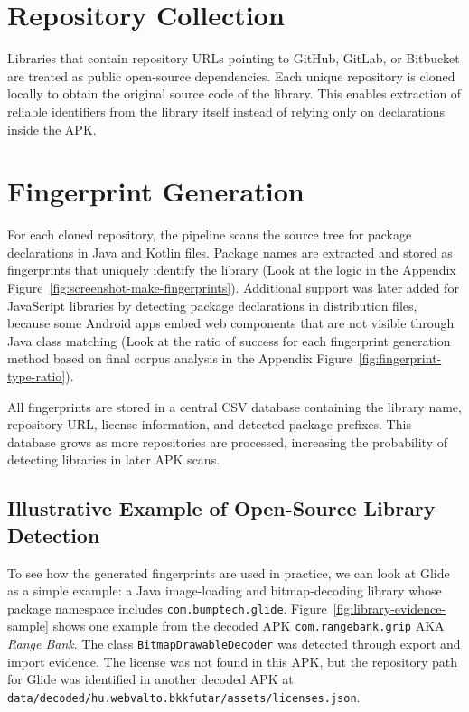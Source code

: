 \documentclass[12pt,a4paper]{report}
\begin{document}
\section{Repository Collection}
Libraries that contain repository URLs pointing to GitHub, GitLab, or Bitbucket are treated as public open‑source dependencies. Each unique repository is cloned locally to obtain the original source code of the library. This enables extraction of reliable identifiers from the library itself instead of relying only on declarations inside the APK. 

\section{Fingerprint Generation}
For each cloned repository, the pipeline scans the source tree for package declarations in Java and Kotlin files. Package names are extracted and stored as fingerprints that uniquely identify the library (Look at the logic in the Appendix Figure~\ref{fig:screenshot-make-fingerprints}). Additional support was later added for JavaScript libraries by detecting package declarations in distribution files, because some Android apps embed web components that are not visible through Java class matching (Look at the ratio of success for each fingerprint generation method based on final corpus analysis in the Appendix Figure~\ref{fig:fingerprint-type-ratio}).

All fingerprints are stored in a central CSV database containing the library name, repository URL, license information, and detected package prefixes. This database grows as more repositories are processed, increasing the probability of detecting libraries in later APK scans.

\subsection{Illustrative Example of Open-Source Library Detection}

To see how the generated fingerprints are used in practice, we can look at Glide as a simple example: a Java image-loading and bitmap-decoding library whose package namespace includes \texttt{com.bumptech.glide}.
Figure~\ref{fig:library-evidence-sample} shows one example from the decoded APK \texttt{com.rangebank.grip} AKA \textit{Range Bank}. The class \texttt{BitmapDrawableDecoder} was detected through export and import evidence. The license was not found in this APK, but the repository path for Glide was identified in another decoded APK at \texttt{data/decoded/hu.webvalto.bkkfutar/assets/licenses.json}.
\end{document}
